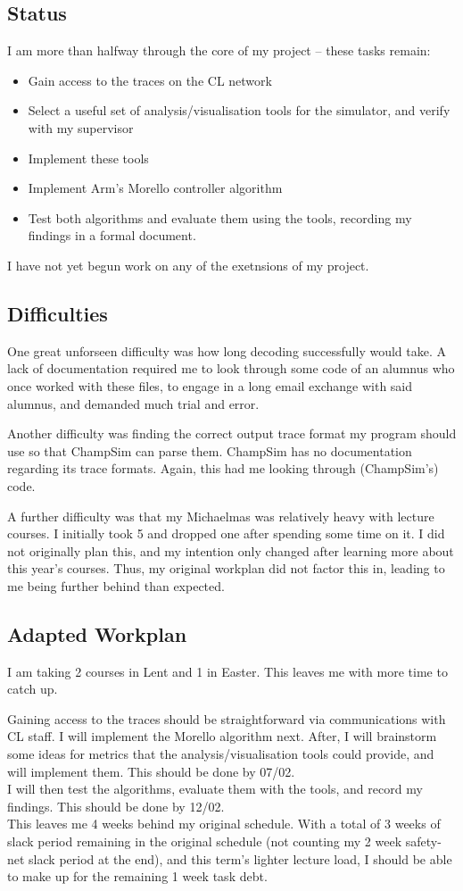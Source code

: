 \documentclass[10pt,a4paper]{article}
\begin{document}
\subsection*{Status}
I am more than halfway through the core of my project -- these tasks remain:
\begin{itemize}
	\item Gain access to the traces on the CL network
	\item Select a useful set of analysis/visualisation tools
	for the simulator, and verify with my supervisor
	\item Implement these tools
	\item Implement Arm's Morello controller algorithm
	\item Test both algorithms and evaluate them using the tools, recording
		my findings in a formal document.
\end{itemize}

I have not yet begun work on any of the exetnsions of my project.

\subsection*{Difficulties}
One great unforseen difficulty was how long decoding successfully would take.
A lack of
documentation required me to
look through some code of an alumnus who once worked with
these files, to engage in a long email exchange with said alumnus, and demanded
much trial and error.

Another difficulty was finding the correct output trace format
my program should use so that ChampSim can parse them.
ChampSim has no documentation
regarding its trace formats. Again, this had me looking through
(ChampSim's) code.

A further difficulty was that my Michaelmas was relatively heavy
with lecture courses. I initially took 5 and dropped one
after spending some time on it. I did not originally plan this, and my
intention only changed after learning more about this year's courses. Thus,
my original workplan did not factor this in, leading to me being further
behind than expected.

\subsection*{Adapted Workplan}
I am taking 2 courses in Lent and 1 in Easter. This leaves me with more time to catch up.

Gaining access to the traces should be straightforward via communications with
CL staff.
I will implement the Morello algorithm next. After, I will brainstorm some
ideas for metrics that the analysis/visualisation tools could provide, and will
implement them. This should be done by 07/02.\\
I will then test the algorithms, evaluate them with the tools, and record my
findings. This should be done by 12/02.\\
This leaves me 4 weeks behind my original schedule. With a total of 3 weeks
of slack period remaining in the original schedule (not counting my 2 week
safety-net slack period at the end), and this term's lighter lecture load, I should
be able to make up for the remaining 1 week task debt.
\end{document}
